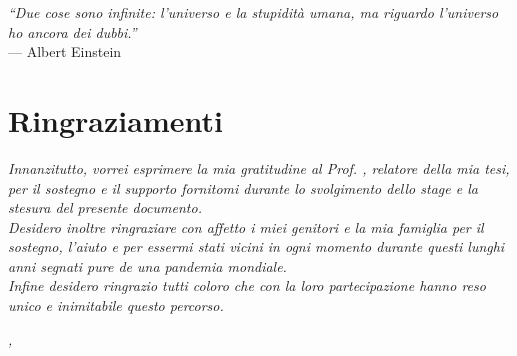 \cleardoublepage
{}
{}

\begin{flushright}{
    \slshape
    ``Due cose sono infinite: l’universo e la stupidità umana, ma riguardo l’universo ho ancora dei dubbi.''} \\
    \medskip
    --- Albert Einstein
\end{flushright}


\bigskip

\begingroup
\let\clearpage\relax
\let\cleardoublepage\relax
\let\cleardoublepage\relax

\chapter*{Ringraziamenti}

\noindent \textit{Innanzitutto, vorrei esprimere la mia gratitudine al Prof. \myProf, relatore della mia tesi, per il sostegno e il supporto fornitomi durante lo svolgimento dello stage e la stesura del presente documento.}\\

\noindent \textit{Desidero inoltre ringraziare con affetto i miei genitori e la mia famiglia per il sostegno,  l'aiuto e per essermi stati vicini in ogni momento durante questi lunghi anni segnati pure de una pandemia mondiale.}\\

\noindent \textit{Infine desidero ringrazio tutti coloro che con la loro partecipazione hanno reso unico e inimitabile questo percorso.}\\
\bigskip

\noindent\textit{\myLocation, \myTime}
\hfill \myName

\endgroup
